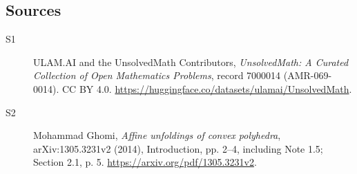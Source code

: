 \documentclass[11pt]{article}
\begin{document}
\subsection{Sources}
\begin{description}
\item[\hypertarget{source:7000014:1}{S1}] ULAM.AI and the UnsolvedMath Contributors, \emph{UnsolvedMath: A Curated Collection of Open Mathematics Problems}, record 7000014 (AMR-069-0014). CC BY 4.0. \url{https://huggingface.co/datasets/ulamai/UnsolvedMath}.
\item[\hypertarget{source:7000014:2}{S2}] Mohammad Ghomi, \emph{Affine unfoldings of convex polyhedra}, arXiv:1305.3231v2 (2014), Introduction, pp. 2--4, including Note 1.5; Section 2.1, p. 5. \url{https://arxiv.org/pdf/1305.3231v2}.
\end{description}
\label{end:7000014}
\end{document}

